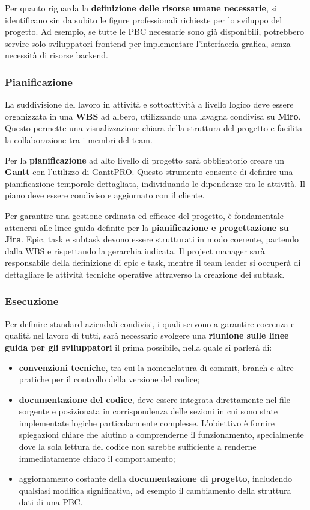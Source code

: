     Per quanto riguarda la \textbf{definizione delle risorse umane necessarie}, si identificano sin da subito le figure professionali richieste
    per lo sviluppo del progetto. Ad esempio, se tutte le \ac{PBC} necessarie sono
    già disponibili, potrebbero servire solo sviluppatori frontend per implementare l’interfaccia grafica, senza necessità di risorse backend.
    
    \subsubsection{Pianificazione}
    La suddivisione del lavoro in attività e sottoattività a livello logico deve essere organizzata in una \textbf{\ac{WBS}} ad albero,
    utilizzando una lavagna condivisa su \textbf{Miro}. Questo permette una visualizzazione chiara della struttura del progetto e
    facilita la collaborazione tra i membri del team.

    Per la \textbf{pianificazione} ad alto livello di progetto sarà obbligatorio creare un \textbf{Gantt} con l’utilizzo di GanttPRO.
    Questo strumento consente di definire una pianificazione temporale dettagliata, individuando le dipendenze tra le attività.
    Il piano deve essere condiviso e aggiornato con il cliente.

    Per garantire una gestione ordinata ed efficace del progetto, è fondamentale attenersi alle linee guida definite per
    la \textbf{pianificazione e progettazione su Jira}. Epic, task e subtask devono essere strutturati in modo coerente,
    partendo dalla \ac{WBS} e rispettando la gerarchia indicata. Il project manager sarà responsabile della definizione di epic e task,
    mentre il team leader si occuperà di dettagliare le attività tecniche operative attraverso la creazione dei subtask.

    \subsubsection{Esecuzione}
    Per definire standard aziendali condivisi, i quali servono a garantire coerenza e qualità nel lavoro di tutti, sarà necessario
    svolgere una \textbf{riunione sulle linee guida per gli sviluppatori} il prima possibile, nella quale si parlerà di:
    \begin{itemize}
        \item \textbf{convenzioni tecniche}, tra cui la nomenclatura di commit, branch e altre pratiche per il controllo della versione
        del codice;
        \item \textbf{documentazione del codice}, deve essere integrata direttamente nel file sorgente e posizionata
        in corrispondenza delle sezioni in cui sono state implementate logiche particolarmente complesse. L'obiettivo è fornire
        spiegazioni chiare che aiutino a comprenderne il funzionamento, specialmente dove la sola lettura del codice non sarebbe
        sufficiente a renderne immediatamente chiaro il comportamento;
        \item aggiornamento costante della \textbf{documentazione di progetto}, includendo qualsiasi modifica significativa,
        ad esempio il cambiamento della struttura dati di una \ac{PBC}.
    \end{itemize}

